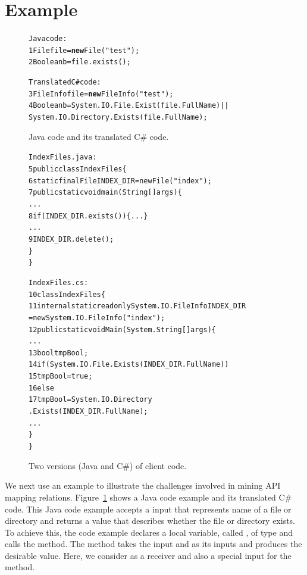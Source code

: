 \section{Example}
\label{sec:example}
\begin{figure}[t]
\begin{CodeOut}
\begin{alltt}
  Java code:
1  File file = \textbf{new} File("test");
2  Boolean b = file.exists();

  Translated C\# code:
3  FileInfo file = \textbf{new} FileInfo("test");
4  Boolean b = System.IO.File.Exist(file.FullName)||
           System.IO.Directory.Exists(file.FullName);
\end{alltt}
\end{CodeOut}\vspace*{-4ex}
\caption{\label{fig:challenge}Java code and its translated C\# code.}%
\end{figure}
\begin{figure}[t]
\begin{CodeOut}\vspace*{-1ex}
\begin{alltt}
  IndexFiles.java:
5 public class IndexFiles \{
6   static final File INDEX_DIR = new File("index");
7   public static void main(String[] args) \{
      ...
8     if (INDEX_DIR.exists()) \{...\}
      ...
9       INDEX_DIR.delete();
    \}
  \}

  IndexFiles.cs:
10 class IndexFiles\{
11   internal static readonly System.IO.FileInfo INDEX_DIR
          = new System.IO.FileInfo("index");
12   public static void  Main(System.String[] args)\{
      ...
13     bool tmpBool;
14     if (System.IO.File.Exists(INDEX_DIR.FullName))
15       tmpBool = true;
16    else
17       tmpBool = System.IO.Directory
                         .Exists(INDEX_DIR.FullName);
      ...
    \}
 \}
\end{alltt}
\end{CodeOut}\vspace*{-4ex}
\caption{\label{fig:clientcode} Two versions (Java and C\#) of
client code.}\vspace*{-2ex}
\end{figure}

We next use an example to illustrate the challenges involved in
mining API mapping relations. Figure~\ref{fig:challenge} shows a
Java code example and its translated C\# code. This Java code
example accepts a  input that represents name of a
file or directory and returns a  value that
describes whether the file or directory exists. To achieve this, the
code example declares a local variable, called , of
type  and calls the  method. The
method takes the  input and  as its
inputs and produces the desirable  value. Here, we
consider  as a receiver and also a special input for
the  method.

